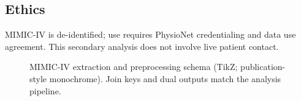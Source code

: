 \subsection{Ethics}
MIMIC-IV is de-identified; use requires PhysioNet credentialing and data use agreement. This secondary analysis does not involve live patient contact.

\begin{figure}[htbp]
  \centering
  \resizebox{\textwidth}{!}{}
  \caption{MIMIC-IV extraction and preprocessing schema (TikZ; publication-style monochrome). Join keys and dual outputs match the analysis pipeline.}
  \label{fig:schema}
\end{figure}
